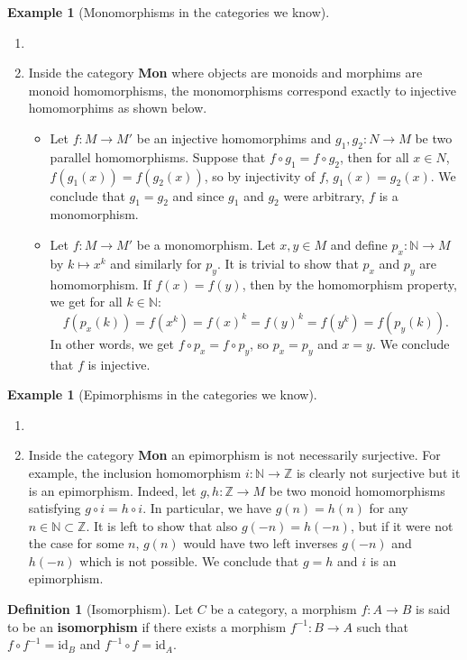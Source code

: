 \documentclass{scrartcl}
\theoremstyle{definition}
\newtheorem{defn}[thm]{Definition}
\newtheorem{exmp}[thm]{Example}
\theoremstyle{remark}
\newcommand{\N}{\mathbb{N}}
\newcommand{\Z}{\mathbb{Z}}
\newcommand{\id}{\text{id}}
\begin{document}
\begin{exmp}[Monomorphisms in the categories we know]
\begin{enumerate}\item[]
    \item Inside the category \textbf{Mon} where objects are monoids and morphims are monoid homomorphisms, the monomorphisms correspond exactly to injective homomorphims as shown below.
    \begin{itemize}
        \item Let $f:M\rightarrow M'$ be an injective homomorphims and $g_1,g_2:N\rightarrow M$ be two parallel homomorphisms. Suppose that $f\circ g_1 = f\circ g_2$, then for all $x \in N$, $f(g_1(x)) = f(g_2(x))$, so by injectivity of $f$, $g_1(x) = g_2(x)$. We conclude that $g_1 = g_2$ and since $g_1$ and $g_2$ were arbitrary, $f$ is a monomorphism.
        \item Let $f:M\rightarrow M'$ be a monomorphism. Let $x,y \in M$ and define $p_x :\N \rightarrow M$ by $k\mapsto x^k$ and similarly for $p_y$. It is trivial to show that $p_x$ and $p_y$ are homomorphism. If $f(x) = f(y)$, then by the homomorphism property, we get for all $k \in \N$:
        \[f(p_x(k))= f(x^k) = f(x)^k  = f(y)^k = f(y^k) = f(p_y(k)).\]
        In other words, we get $f\circ p_x = f \circ p_y$, so $p_x = p_y$ and $x = y$. We conclude that $f$ is injective.
    \end{itemize}
\end{enumerate}
\end{exmp}
\begin{exmp}[Epimorphisms in the categories we know]
\begin{enumerate}\item[]
    \item Inside the category \textbf{Mon} an epimorphism is not necessarily surjective. For example, the inclusion homomorphism $i:\N \rightarrow \Z$ is clearly not surjective but it is an epimorphism. Indeed, let $g,h: \Z\rightarrow M$ be two monoid homomorphisms satisfying $g \circ i = h\circ i$. In particular, we have $g(n) = h(n)$ for any $n \in \N\subset \Z$. It is left to show that also $g(-n) = h(-n)$, but if it were not the case for some $n$, $g(n)$ would have two left inverses $g(-n)$ and $h(-n)$ which is not possible. We conclude that $g = h$ and $i$ is an epimorphism.
\end{enumerate}
\end{exmp}
\begin{defn}[Isomorphism]
    Let $C$ be a category, a morphism $f:A\rightarrow B$ is said to be an \textbf{isomorphism} if there exists a morphism $f^{-1}: B\rightarrow A$ such that $f\circ f^{-1} = \id_B$ and $f^{-1}\circ f = \id_A$.
\end{defn}
\end{document}
